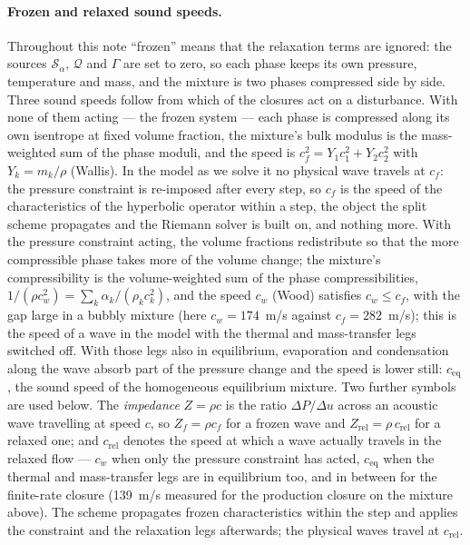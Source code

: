 \documentclass[11pt,a4paper]{article}
\newcommand{\ceq}{c_{\mathrm{eq}}}
\newcommand{\cf}{c_{f}}
\newcommand{\cw}{c_{w}}
\begin{document}
\paragraph{Frozen and relaxed sound speeds.}  Throughout this note
``frozen'' means that the relaxation terms are ignored: the sources
$\mathcal{S}_\alpha$, $\mathcal{Q}$ and $\Gamma$ are set to zero, so each
phase keeps its own pressure, temperature and mass, and the mixture is
two phases compressed side by side.  Three sound speeds follow from
which of the closures act on a disturbance.  With none of them acting
--- the frozen system --- each phase is compressed along its own
isentrope at fixed volume fraction, the mixture's bulk modulus is the
mass-weighted sum of the phase moduli, and the speed is
$\cf^2 = Y_1 c_1^2 + Y_2 c_2^2$ with $Y_k = m_k/\rho$ (Wallis).  In the
model as we solve it no physical wave travels at $\cf$: the pressure
constraint is re-imposed after every step, so $\cf$ is the speed of the
characteristics of the hyperbolic operator within a step, the object
the split scheme propagates and the Riemann solver is built on, and
nothing more.  With the pressure constraint acting, the volume
fractions redistribute so that the more compressible phase takes more
of the volume change; the mixture's compressibility is the
volume-weighted sum of the phase compressibilities,
$1/(\rho\cw^2) = \sum_k \alpha_k/(\rho_k c_k^2)$, and the speed $\cw$
(Wood) satisfies $\cw \le \cf$, with the gap large in a bubbly mixture
(here $\cw = 174$~m/s against $\cf = 282$~m/s); this is the speed of a
wave in the model with the thermal and mass-transfer legs switched off.
With those legs also in equilibrium, evaporation and condensation along
the wave absorb part of the pressure change and the speed is lower
still: $\ceq$, the sound speed of the homogeneous equilibrium
mixture.  Two further symbols are used below.  The
\emph{impedance} $Z = \rho c$ is the ratio $\Delta P/\Delta u$ across an
acoustic wave travelling at speed $c$, so $Z_f = \rho\cf$ for a frozen
wave and $Z_{\mathrm{rel}} = \rho\,c_{\mathrm{rel}}$ for a relaxed one;
and $c_{\mathrm{rel}}$ denotes the speed at which a wave actually travels
in the relaxed flow --- $\cw$ when only the pressure constraint has
acted, $\ceq$ when the thermal and mass-transfer legs are in
equilibrium too, and in between for the finite-rate closure (139~m/s
measured for the production closure on the mixture above).  The scheme
propagates frozen characteristics within the step and applies the
constraint and the relaxation legs afterwards; the physical waves
travel at $c_{\mathrm{rel}}$.
\end{document}
